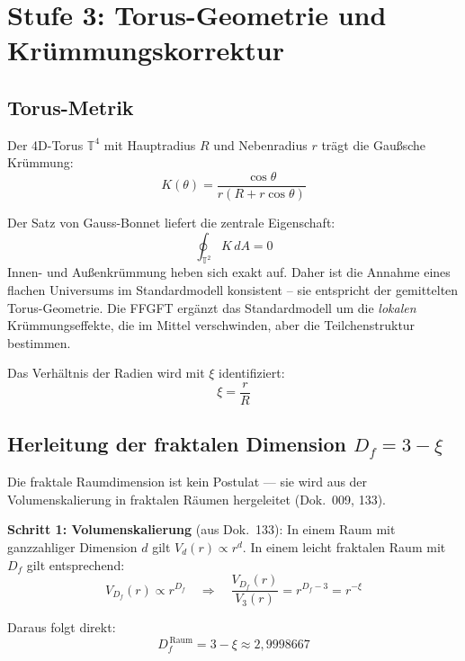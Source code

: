 \section{Stufe 3: Torus-Geometrie und Krümmungs\-korrektur}

\subsection{Torus-Metrik}

Der 4D-Torus $\mathbb{T}^4$ mit Hauptradius $R$ und Nebenradius $r$
trägt die Gaußsche Krümmung:
\begin{equation}
    K(\theta) = \frac{\cos\theta}{r(R + r\cos\theta)}
\end{equation}

Der Satz von Gauss-Bonnet liefert die zentrale Eigenschaft:
\begin{equation}
    \oint_{\mathbb{T}^2} K \, dA = 0
\end{equation}
Innen- und Außenkrümmung heben sich exakt auf. Daher ist die
Annahme eines flachen Universums im Standardmodell konsistent -- sie
entspricht der gemittelten Torus-Geometrie. Die FFGFT ergänzt das
Standardmodell um die \emph{lokalen} Krümmungseffekte, die im
Mittel verschwinden, aber die Teilchenstruktur bestimmen.

Das Verhältnis der Radien wird mit $\xi$ identifiziert:
\begin{equation}
    \xi = \frac{r}{R}
\end{equation}

\subsection{Herleitung der fraktalen Dimension \texorpdfstring{$D_f = 3 - \xi$}{Df = 3 - xi}}

Die fraktale Raumdimension ist kein Postulat — sie wird aus der
Volumenskalierung in fraktalen Räumen hergeleitet (Dok.~009, 133).

\textbf{Schritt 1: Volumenskalierung} (aus Dok.~133):
In einem Raum mit ganzzahliger Dimension $d$ gilt $V_d(r) \propto r^d$.
In einem leicht fraktalen Raum mit $D_f$ gilt entsprechend:
\begin{equation}
    V_{D_f}(r) \propto r^{D_f}
    \quad \Rightarrow \quad
    \frac{V_{D_f}(r)}{V_3(r)} = r^{D_f - 3} = r^{-\xi}
\end{equation}

Daraus folgt direkt:
\begin{equation}
    \boxed{D_f^{\,\text{Raum}} = 3 - \xi \approx 2{,}9998667}
\end{equation}


